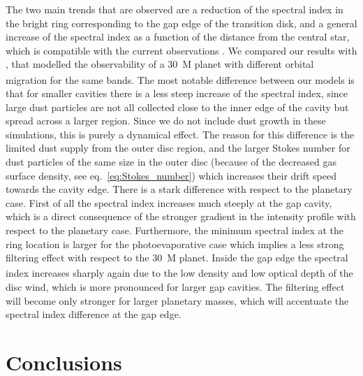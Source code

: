 \documentclass[fleqn,usenatbib]{mnras}
\begin{document}
    The two main trends that are observed are a reduction of the spectral index in the bright ring corresponding to the gap edge of the transition disk, and a general increase of the spectral index as a function of the distance from the central star, which is compatible with the current observations \citep[e.g.][]{Long2020}.
    We compared our results with \citet{Nazari_2019}, that modelled the observability of a \SI{30}{M_\oplus} planet with different orbital migration for the same bands. 
    The most notable difference between our models is that for smaller cavities there is a less steep increase of the spectral index, since large dust particles are not all collected close to the inner edge of the cavity but spread across a larger region.
    Since we do not include dust growth in these simulations, this is purely a dynamical effect. The reason for this difference is the limited dust supply from the outer disc region, and the larger Stokes number for dust particles of the same size in the outer disc (because of the decreased gas surface density, see eq.~\ref{eq:Stokes_number}) which increases their drift speed towards the cavity edge. There is a stark difference with respect to the planetary case. First of all the spectral index increases much steeply at the gap cavity, which is a direct consequence of the stronger gradient in the intensity profile with respect to the planetary case. Furthermore, the minimum spectral index at the ring location is larger for the photoevaporative case which implies a less strong filtering effect with respect to the \SI{30}{M_\oplus} planet. Inside the gap edge the spectral index increases sharply again due to the low density and low optical depth of the disc wind, which is more pronounced for larger gap cavities. The filtering effect will become only stronger for larger planetary masses, which will accentuate the spectral index difference at the gap edge.

\section{Conclusions} \label{sec:conclusions}
\end{document}
